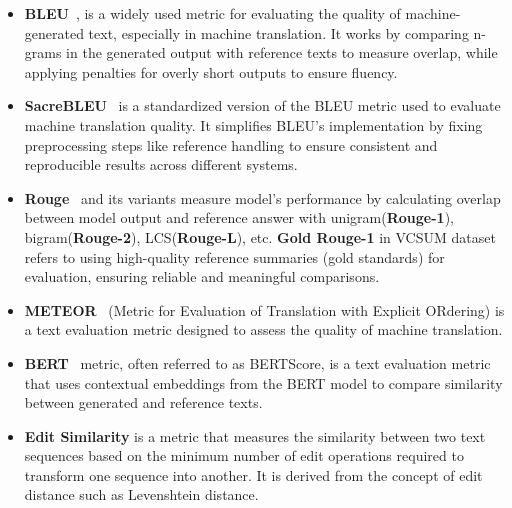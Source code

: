 \begin{itemize}[leftmargin=10pt]
    \item \textbf{BLEU}~\cite{papineni-etal-2002-bleu}, is a widely used metric for evaluating the quality of machine-generated text, especially in machine translation. It works by comparing n-grams in the generated output with reference texts to measure overlap, while applying penalties for overly short outputs to ensure fluency. %
    \item \textbf{SacreBLEU}~\cite{post-2018-call-sacrebleu} is a standardized version of the BLEU metric used to evaluate machine translation quality. It simplifies BLEU's implementation by fixing preprocessing steps like reference handling to ensure consistent and reproducible results across different systems. %
    \item  \textbf{Rouge}~\cite{lin-2004-rouge} and its variants measure model's performance by calculating overlap between model output and reference answer with unigram(\textbf{Rouge-1}), bigram(\textbf{Rouge-2}), LCS(\textbf{Rouge-L}), etc. \textbf{Gold Rouge-1} in VCSUM dataset refers to using high-quality reference summaries (gold standards) for evaluation, ensuring reliable and meaningful comparisons. %
    \item \textbf{METEOR}~\cite{denkowski-lavie-2011-meteor} (Metric for Evaluation of Translation with Explicit ORdering) is a text evaluation metric designed to assess the quality of machine translation. %
    \item \textbf{BERT}~\cite{zhang2020bertscoreevaluatingtextgeneration} metric, often referred to as BERTScore, is a text evaluation metric that uses contextual embeddings from the BERT model to compare similarity between generated and reference texts. %
    \item    \textbf{Edit Similarity} is a metric that measures the similarity between two text sequences based on the minimum number of edit operations required to transform one sequence into another. It is derived from the concept of edit distance such as Levenshtein distance. %

\end{itemize}
